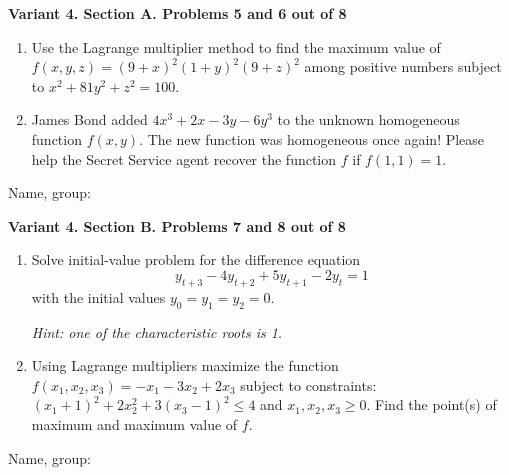 \documentclass[12pt,a4paper]{article}
\begin{document}
\newpage
\textbf{Variant 4. Section A. Problems 5 and 6 out of 8}

\begin{enumerate}[resume]
\item Use the Lagrange multiplier method to find the maximum value of $f(x,y,z)=(9+x)^2(1+y)^2(9+z)^2$ among positive numbers subject to $x^2 + 81y^2 + z^2 = 100$.

\item James Bond added $4x^3+2x-3y - 6y^3$ to the unknown homogeneous function $f(x, y)$. The new function was homogeneous once again! Please help the Secret Service agent recover the function $f$ if $f(1, 1)=1$.

\end{enumerate}


\begin{framed}
\begin{minipage}{42em}
Name, group:\vspace*{3ex}\par
\noindent\dotfill
\end{minipage}
\end{framed}

\newpage
\textbf{Variant 4. Section B. Problems 7 and 8 out of 8}

\begin{enumerate}[resume]

\item Solve initial-value problem for the difference equation
\[
y_{t+3} -4y_{t+2} +5y_{t+1} -2y_{t} =1
\]
with the initial values $y_{0} =y_{1} =y_{2} =0$.

\textit{Hint: one of the characteristic roots is 1.}

\item Using Lagrange multipliers maximize the function $f(x_1,x_2,x_3)=-x_1-3x_2+2x_3$ subject to constraints:   $(x_1+1)^2+2x_2^2+3(x_3-1)^2\leq 4$ and $x_1, x_2, x_3 \geq 0$. Find the point(s) of maximum and maximum value of $f$.

\end{enumerate}


\begin{framed}
\begin{minipage}{42em}
Name, group:\vspace*{3ex}\par
\noindent\dotfill
\end{minipage}
\end{framed}
\end{document}
